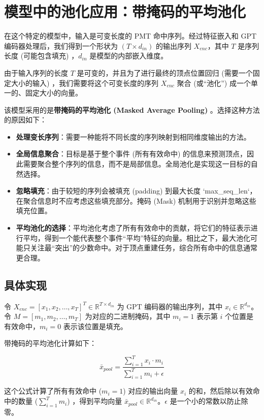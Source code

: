 \section{模型中的池化应用：带掩码的平均池化}

在这个特定的模型中，输入是可变长度的 PMT 命中序列。经过特征嵌入和 GPT 编码器处理后，我们得到一个形状为 $(T \times d_{in})$ 的输出序列 $X_{enc}$，其中 $T$ 是序列长度 (可能包含填充) ，$d_{in}$ 是模型的内部嵌入维度。

由于输入序列的长度 $T$ 是可变的，并且为了进行最终的顶点位置回归 (需要一个固定大小的输入) ，我们需要将这个可变长度的序列 $X_{enc}$ 聚合 (或“池化”) 成一个单一的、固定大小的向量。

该模型采用的是\textbf{带掩码的平均池化 (Masked Average Pooling) }。选择这种方法的原因如下：
\begin{itemize}
    \item \textbf{处理变长序列}：需要一种能将不同长度的序列映射到相同维度输出的方法。
    \item \textbf{全局信息聚合}：目标是基于整个事件 (所有有效命中) 的信息来预测顶点，因此需要聚合整个序列的信息，而不是局部信息。全局池化是实现这一目标的自然选择。
    \item \textbf{忽略填充}：由于较短的序列会被填充 (padding) 到最大长度 `max\_seq\_len`，在聚合信息时不应考虑这些填充部分。掩码 (Mask) 机制用于识别并忽略这些填充位置。
    \item \textbf{平均池化的选择}：平均池化考虑了所有有效命中的贡献，将它们的特征表示进行平均，得到一个能代表整个事件“平均”特征的向量。相比之下，最大池化可能只关注最“突出”的少数命中。对于顶点重建任务，综合所有命中的信息通常更合理。
\end{itemize}

\subsection{具体实现}

令 $X_{enc} = [x_1, x_2, \dots, x_T]^T \in \mathbb{R}^{T \times d_{in}}$ 为 GPT 编码器的输出序列，其中 $x_i \in \mathbb{R}^{d_{in}}$。
令 $M = [m_1, m_2, \dots, m_T]$ 为对应的二进制掩码，其中 $m_i=1$ 表示第 $i$ 个位置是有效命中，$m_i=0$ 表示该位置是填充。

带掩码的平均池化计算如下：

\[ \bar{x}_{pool} = \frac{\sum_{i=1}^{T} x_i \cdot m_i}{\sum_{i=1}^{T} m_i + \epsilon} \]

这个公式计算了所有有效命中 ($m_i=1$) 对应的输出向量 $x_i$ 的和，然后除以有效命中的数量 ($\sum_{i=1}^{T} m_i$) ，得到平均向量 $\bar{x}_{pool} \in \mathbb{R}^{d_{in}}$。$\epsilon$ 是一个小的常数以防止除零。

